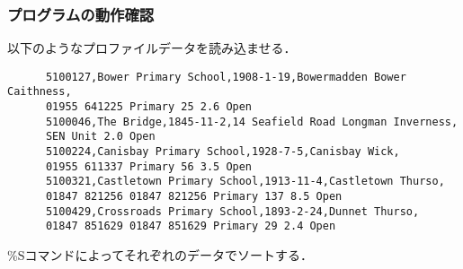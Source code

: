     \subsubsection{プログラムの動作確認}
    以下のようなプロファイルデータを読み込ませる．
    \begin{verbatim}
      5100127,Bower Primary School,1908-1-19,Bowermadden Bower Caithness,
      01955 641225 Primary 25 2.6 Open
      5100046,The Bridge,1845-11-2,14 Seafield Road Longman Inverness,
      SEN Unit 2.0 Open
      5100224,Canisbay Primary School,1928-7-5,Canisbay Wick,
      01955 611337 Primary 56 3.5 Open
      5100321,Castletown Primary School,1913-11-4,Castletown Thurso,
      01847 821256 01847 821256 Primary 137 8.5 Open
      5100429,Crossroads Primary School,1893-2-24,Dunnet Thurso,
      01847 851629 01847 851629 Primary 29 2.4 Open
    \end{verbatim}
    \%Sコマンドによってそれぞれのデータでソートする．
